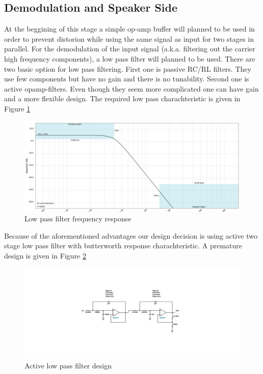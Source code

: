 \documentclass[a4paper,10pt]{IEEEtran}
\begin{document}
\subsection{Demodulation and Speaker Side}
At the beggining of this stage a simple op-amp buffer will planned to be used in order to prevent distorion while using the same signal as input for two stages in parallel. For the demodulation of the input signal (a.k.a. filtering out the carrier high frequency components), a low pass filter will planned to be used. There are two basic  option for low pass filtering. First one is passive RC/RL filters. They use few components but have no gain and there is no tunability. Second one is active opamp-filters. Even though they seem more complicated one can have gain and a more flexible design. The required low pass charachteristic is given in Figure \ref*{low_pass_plot}
\begin{figure}[htbp!]
    \centering
    \includegraphics[width = 0.75\linewidth]{active_low_pass.png}
    \caption{Low pass filter frequency response}
    \label{low_pass_plot}    
\end{figure} 
Because of the aforementioned advantages our design decision is using active two stage low pass filter with butterworth response charachteristic. A premature design is given in Figure \ref*{low_pass_sch}
\begin{figure}[htbp!]
    \centering
    \includegraphics[width = 1\linewidth]{active_low_pass_circuit.png}
    \caption{Active low pass filter design}
    \label{low_pass_sch}    
\end{figure} 
\end{document}
